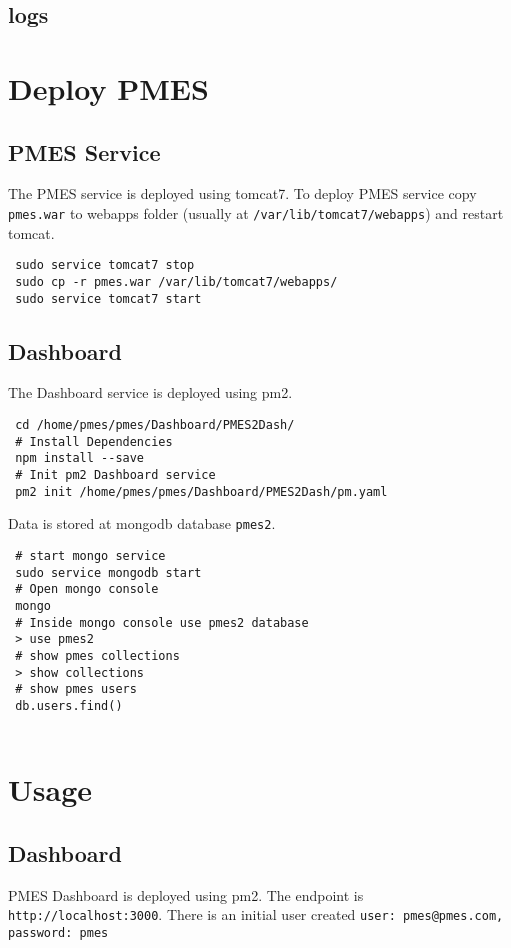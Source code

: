 \documentclass[a4paper,10pt]{article}
\begin{document}
\subsection{logs}

\section{Deploy PMES}
\subsection{PMES Service}
The PMES service is deployed using tomcat7. To deploy PMES service copy \texttt{pmes.war} to webapps folder (usually at \texttt{/var/lib/tomcat7/webapps}) and restart tomcat.

\begin{verbatim}
 sudo service tomcat7 stop
 sudo cp -r pmes.war /var/lib/tomcat7/webapps/
 sudo service tomcat7 start
\end{verbatim}


\subsection{Dashboard}
The Dashboard service is deployed using pm2.\\
\begin{verbatim}
 cd /home/pmes/pmes/Dashboard/PMES2Dash/
 # Install Dependencies
 npm install --save
 # Init pm2 Dashboard service
 pm2 init /home/pmes/pmes/Dashboard/PMES2Dash/pm.yaml
\end{verbatim}

Data is stored at mongodb database \texttt{pmes2}.
\begin{verbatim}
 # start mongo service
 sudo service mongodb start
 # Open mongo console
 mongo
 # Inside mongo console use pmes2 database
 > use pmes2
 # show pmes collections
 > show collections
 # show pmes users
 db.users.find()
 
\end{verbatim}

\section{Usage}
\subsection{Dashboard}
PMES Dashboard is  deployed using pm2. The endpoint is \texttt{http://localhost:3000}. There is an initial user created \texttt{user: pmes@pmes.com, password: pmes}
\end{document}
